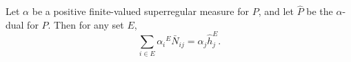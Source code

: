 Let $\alpha$ be a positive finite-valued superregular measure for $P$, and let $\hat{P}$ be the $\alpha$-dual for $P$. Then for any set $E$,
$$\sum_{i \in E} \alpha_i {}^E \bar{N}_{ij} = \alpha_j \hat{h}_j^E.$$
